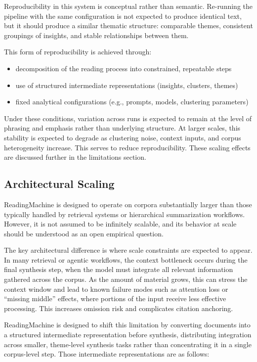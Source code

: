 \documentclass[
  11pt,
]{article}
\providecommand{\tightlist}{%
  \setlength{\itemsep}{0pt}\setlength{\parskip}{0pt}}
\begin{document}
Reproducibility in this system is conceptual rather than semantic.
Re-running the pipeline with the same configuration is not expected to
produce identical text, but it should produce a similar thematic
structure: comparable themes, consistent groupings of insights, and
stable relationships between them.

This form of reproducibility is achieved through:

\begin{itemize}
\tightlist
\item
  decomposition of the reading process into constrained, repeatable
  steps
\item
  use of structured intermediate representations (insights, clusters,
  themes)
\item
  fixed analytical configurations (e.g., prompts, models, clustering
  parameters)
\end{itemize}

Under these conditions, variation across runs is expected to remain at
the level of phrasing and emphasis rather than underlying structure. At
larger scales, this stability is expected to degrade as clustering
noise, context inputs, and corpus heterogeneity increase. This serves to
reduce reproducibility. These scaling effects are discussed further in
the limitations section.

\subsection{Architectural Scaling}\label{architectural-scaling}

ReadingMachine is designed to operate on corpora substantially larger
than those typically handled by retrieval systems or hierarchical
summarization workflows. However, it is not assumed to be infinitely
scalable, and its behavior at scale should be understood as an open
empirical question.

The key architectural difference is where scale constraints are expected
to appear. In many retrieval or agentic workflows, the context
bottleneck occurs during the final synthesis step, when the model must
integrate all relevant information gathered across the corpus. As the
amount of material grows, this can stress the context window and lead to
known failure modes such as attention loss or ``missing middle''
effects, where portions of the input receive less effective processing.
This increases omission risk and complicates citation anchoring.

ReadingMachine is designed to shift this limitation by converting
documents into a structured intermediate representation before
synthesis, distributing integration across smaller, theme-level
synthesis tasks rather than concentrating it in a single corpus-level
step. Those intermediate representations are as follows:
\end{document}
